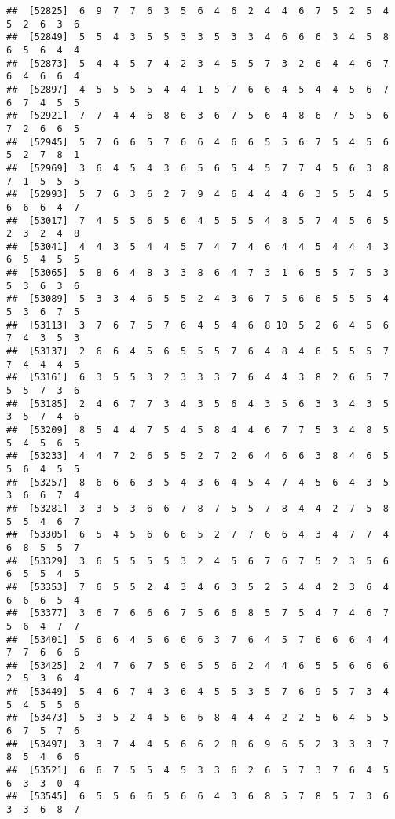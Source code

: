 \documentclass[
]{book}
\begin{document}
\begin{verbatim}
##  [52825]  6  9  7  7  6  3  5  6  4  6  2  4  4  6  7  5  2  5  4  5  2  6  3  6
##  [52849]  5  5  4  3  5  5  3  3  5  3  3  4  6  6  6  3  4  5  8  6  5  6  4  4
##  [52873]  5  4  4  5  7  4  2  3  4  5  5  7  3  2  6  4  4  6  7  6  4  6  6  4
##  [52897]  4  5  5  5  5  4  4  1  5  7  6  6  4  5  4  4  5  6  7  6  7  4  5  5
##  [52921]  7  7  4  4  6  8  6  3  6  7  5  6  4  8  6  7  5  5  6  7  2  6  6  5
##  [52945]  5  7  6  6  5  7  6  6  4  6  6  5  5  6  7  5  4  5  6  5  2  7  8  1
##  [52969]  3  6  4  5  4  3  6  5  6  5  4  5  7  7  4  5  6  3  8  7  1  5  5  5
##  [52993]  5  7  6  3  6  2  7  9  4  6  4  4  4  6  3  5  5  4  5  6  6  6  4  7
##  [53017]  7  4  5  5  6  5  6  4  5  5  5  4  8  5  7  4  5  6  5  2  3  2  4  8
##  [53041]  4  4  3  5  4  4  5  7  4  7  4  6  4  4  5  4  4  4  3  6  5  4  5  5
##  [53065]  5  8  6  4  8  3  3  8  6  4  7  3  1  6  5  5  7  5  3  5  3  6  3  6
##  [53089]  5  3  3  4  6  5  5  2  4  3  6  7  5  6  6  5  5  5  4  5  3  6  7  5
##  [53113]  3  7  6  7  5  7  6  4  5  4  6  8 10  5  2  6  4  5  6  7  4  3  5  3
##  [53137]  2  6  6  4  5  6  5  5  5  7  6  4  8  4  6  5  5  5  7  7  4  4  4  5
##  [53161]  6  3  5  5  3  2  3  3  3  7  6  4  4  3  8  2  6  5  7  5  5  7  3  6
##  [53185]  2  4  6  7  7  3  4  3  5  6  4  3  5  6  3  3  4  3  5  3  5  7  4  6
##  [53209]  8  5  4  4  7  5  4  5  8  4  4  6  7  7  5  3  4  8  5  5  4  5  6  5
##  [53233]  4  4  7  2  6  5  5  2  7  2  6  4  6  6  3  8  4  6  5  5  6  4  5  5
##  [53257]  8  6  6  6  3  5  4  3  6  4  5  4  7  4  5  6  4  3  5  3  6  6  7  4
##  [53281]  3  3  5  3  6  6  7  8  7  5  5  7  8  4  4  2  7  5  8  5  5  4  6  7
##  [53305]  6  5  4  5  6  6  6  5  2  7  7  6  6  4  3  4  7  7  4  6  8  5  5  7
##  [53329]  3  6  5  5  5  5  3  2  4  5  6  7  6  7  5  2  3  5  6  6  5  5  4  5
##  [53353]  7  6  5  5  2  4  3  4  6  3  5  2  5  4  4  2  3  6  4  6  6  6  5  4
##  [53377]  3  6  7  6  6  6  7  5  6  6  8  5  7  5  4  7  4  6  7  5  6  4  7  7
##  [53401]  5  6  6  4  5  6  6  6  3  7  6  4  5  7  6  6  6  4  4  7  7  6  6  6
##  [53425]  2  4  7  6  7  5  6  5  5  6  2  4  4  6  5  5  6  6  6  2  5  3  6  4
##  [53449]  5  4  6  7  4  3  6  4  5  5  3  5  7  6  9  5  7  3  4  5  4  5  5  6
##  [53473]  5  3  5  2  4  5  6  6  8  4  4  4  2  2  5  6  4  5  5  6  7  5  7  6
##  [53497]  3  3  7  4  4  5  6  6  2  8  6  9  6  5  2  3  3  3  7  8  5  4  6  6
##  [53521]  6  6  7  5  5  4  5  3  3  6  2  6  5  7  3  7  6  4  5  6  3  3  0  4
##  [53545]  6  5  5  6  6  5  6  6  4  3  6  8  5  7  8  5  7  3  6  3  3  6  8  7

\end{verbatim}
\end{document}

